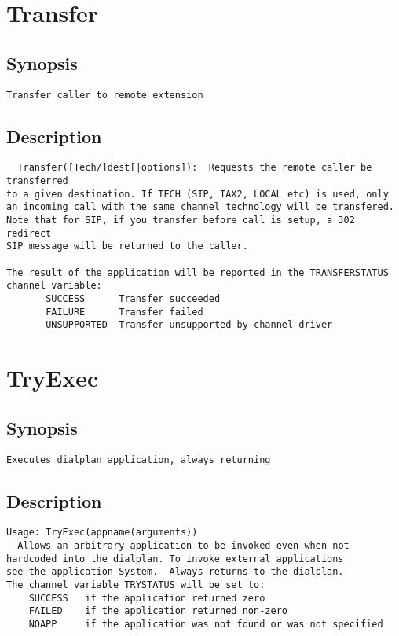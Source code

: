 \section{Transfer}
\subsection{Synopsis}
\begin{verbatim}
Transfer caller to remote extension
\end{verbatim}
\subsection{Description}
\begin{verbatim}
  Transfer([Tech/]dest[|options]):  Requests the remote caller be transferred
to a given destination. If TECH (SIP, IAX2, LOCAL etc) is used, only
an incoming call with the same channel technology will be transfered.
Note that for SIP, if you transfer before call is setup, a 302 redirect
SIP message will be returned to the caller.

The result of the application will be reported in the TRANSFERSTATUS
channel variable:
       SUCCESS      Transfer succeeded
       FAILURE      Transfer failed
       UNSUPPORTED  Transfer unsupported by channel driver

\end{verbatim}


\section{TryExec}
\subsection{Synopsis}
\begin{verbatim}
Executes dialplan application, always returning
\end{verbatim}
\subsection{Description}
\begin{verbatim}
Usage: TryExec(appname(arguments))
  Allows an arbitrary application to be invoked even when not
hardcoded into the dialplan. To invoke external applications
see the application System.  Always returns to the dialplan.
The channel variable TRYSTATUS will be set to:
    SUCCESS   if the application returned zero
    FAILED    if the application returned non-zero
    NOAPP     if the application was not found or was not specified

\end{verbatim}


